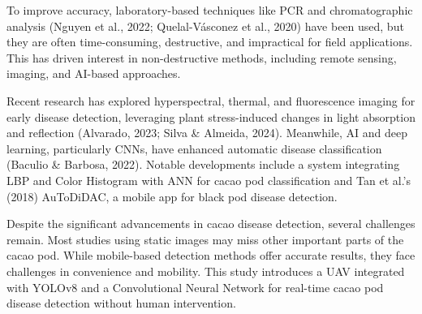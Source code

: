 To improve accuracy, laboratory-based techniques like PCR and chromatographic analysis (Nguyen et al., 2022; Quelal-Vásconez et al., 2020) have been used, but they are often time-consuming, destructive, and impractical for field applications. This has driven interest in non-destructive methods, including remote sensing, imaging, and AI-based approaches.

Recent research has explored hyperspectral, thermal, and fluorescence imaging for early disease detection, leveraging plant stress-induced changes in light absorption and reflection (Alvarado, 2023; Silva \& Almeida, 2024). Meanwhile, AI and deep learning, particularly CNNs, have enhanced automatic disease classification (Baculio \& Barbosa, 2022). Notable developments include a system integrating LBP and Color Histogram with ANN for cacao pod classification and Tan et al.'s (2018) AuToDiDAC, a mobile app for black pod disease detection.

Despite the significant advancements in cacao disease detection, several challenges remain. Most studies using static images may miss other important parts of the cacao pod. While mobile-based detection methods offer accurate results, they face challenges in convenience and mobility. This study introduces a UAV integrated with YOLOv8 and a Convolutional Neural Network for real-time cacao pod disease detection without human intervention.
